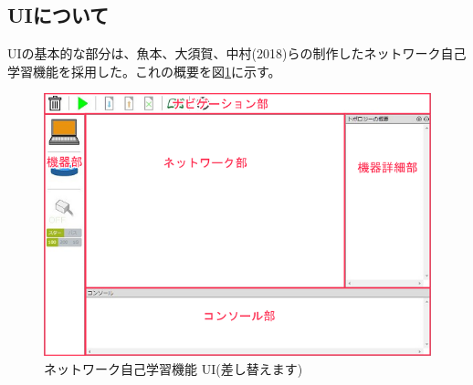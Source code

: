 \subsection{UIについて}
\label{tag:ui}
UIの基本的な部分は、魚本、大須賀、中村(2018)らの制作したネットワーク自己学習機能を採用した。これの概要を図\ref{fig:simu}に示す。

\begin{figure}[htbp]
  \begin{center}
    \includegraphics[scale=0.3]{img/simu.png}
    \caption{ネットワーク自己学習機能 UI(差し替えます)}
    \label{fig:simu}
  \end{center}
\end{figure}

